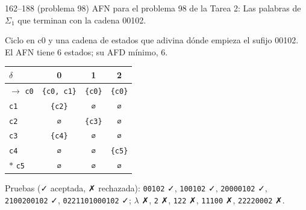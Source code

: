 \documentclass[11pt]{article}
\begin{document}
\begin{ejercicio}{162--188 (problema 98)}{}
AFN para el problema 98 de la Tarea 2: Las palabras de $\Sigma_1$ que terminan con la cadena 00102.
\end{ejercicio}
\proc Ciclo en c0 y una cadena de estados que adivina dónde empieza el sufijo 00102. El AFN tiene 6 estados; su AFD mínimo, 6.
\begin{center}\small\begin{tabular}{lccc}\toprule
$\delta$ & 0 & 1 & 2 \\\midrule
$\to$ \texttt{c0} & \texttt{\{c0, c1\}} & \texttt{\{c0\}} & \texttt{\{c0\}} \\
 \texttt{c1} & \texttt{\{c2\}} & \texttt{∅} & \texttt{∅} \\
 \texttt{c2} & \texttt{∅} & \texttt{\{c3\}} & \texttt{∅} \\
 \texttt{c3} & \texttt{\{c4\}} & \texttt{∅} & \texttt{∅} \\
 \texttt{c4} & \texttt{∅} & \texttt{∅} & \texttt{\{c5\}} \\
$*$ \texttt{c5} & \texttt{∅} & \texttt{∅} & \texttt{∅} \\
\bottomrule\end{tabular}\end{center}
Pruebas (✓ aceptada, ✗ rechazada): \texttt{00102} ✓, \texttt{100102} ✓, \texttt{20000102} ✓, \texttt{2100200102} ✓, \texttt{0221101000102} ✓; $\lambda$ ✗, \texttt{2} ✗, \texttt{122} ✗, \texttt{11100} ✗, \texttt{22220002} ✗.
\end{document}
